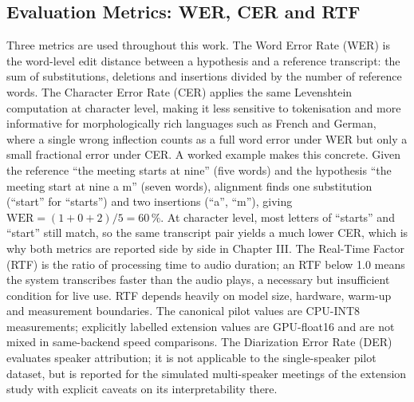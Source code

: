 \documentclass[12pt]{report}
\begin{document}
\subsection{Evaluation Metrics: WER, CER and RTF}
Three metrics are used throughout this work. The Word Error Rate (WER) is the word-level edit distance between a hypothesis and a reference transcript: the sum of substitutions, deletions and insertions divided by the number of reference words. The Character Error Rate (CER) applies the same Levenshtein computation at character level, making it less sensitive to tokenisation and more informative for morphologically rich languages such as French and German, where a single wrong inflection counts as a full word error under WER but only a small fractional error under CER.
A worked example makes this concrete. Given the reference \enquote{the meeting starts at nine} (five words) and the hypothesis \enquote{the meeting start at nine a m} (seven words), alignment finds one substitution (\enquote{start} for \enquote{starts}) and two insertions (\enquote{a}, \enquote{m}), giving $\mathrm{WER} = (1+0+2)/5 = 60\,\%$. At character level, most letters of \enquote{starts} and \enquote{start} still match, so the same transcript pair yields a much lower CER, which is why both metrics are reported side by side in Chapter III.
The Real-Time Factor (RTF) is the ratio of processing time to audio duration; an RTF below 1.0 means the system transcribes faster than the audio plays, a necessary but insufficient condition for live use. RTF depends heavily on model size, hardware, warm-up and measurement boundaries. The canonical pilot values are CPU-INT8 measurements; explicitly labelled extension values are GPU-float16 and are not mixed in same-backend speed comparisons. The Diarization Error Rate (DER) evaluates speaker attribution; it is not applicable to the single-speaker pilot dataset, but is reported for the simulated multi-speaker meetings of the extension study with explicit caveats on its interpretability there.
\end{document}
